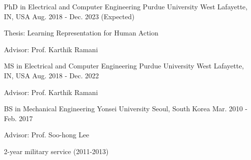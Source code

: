 


\begin{cventries}


    \cventry
    {PhD in Electrical and Computer Engineering} %
    {Purdue University} %
    {West Lafayette, IN, USA} %
    {Aug. 2018 - Dec. 2023 (Expected)} %
    { %
    \begin{cvitems}
        \item {Thesis: Learning Representation for Human Action}
        \item {Advisor: Prof. Karthik Ramani}
    \end{cvitems}
    }

    \cventry
    {MS in Electrical and Computer Engineering} %
    {Purdue University} %
    {West Lafayette, IN, USA} %
    {Aug. 2018 - Dec. 2022} %
    { %
    \begin{cvitems}
        \item {Advisor: Prof. Karthik Ramani}
    \end{cvitems}
    }

    \cventry
    {BS in Mechanical Engineering} %
    {Yonsei University} %
    {Seoul, South Korea} %
    {Mar. 2010 - Feb. 2017} %
    { %
    \begin{cvitems}
        \item {Advisor: Prof. Soo-hong Lee}
        \item {2-year military service (2011-2013)}
    \end{cvitems}
    }

\end{cventries}
